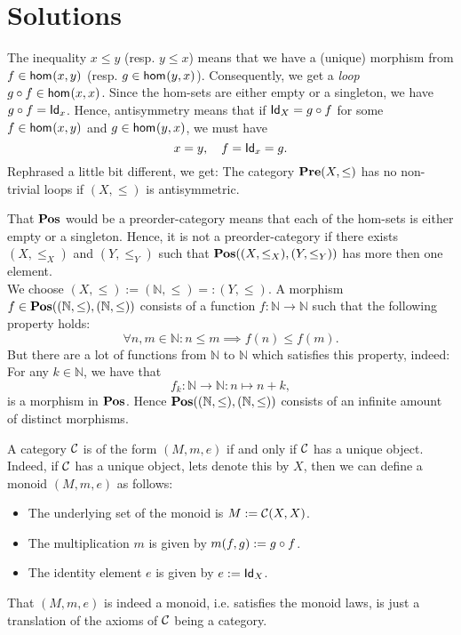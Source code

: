 \section{Solutions}
\label{sec:solutions}

\begin{solution}\label{sol:post_antisymmetry}
The inequality $x\leq y$ (resp. $y\leq x$) means that we have a (unique) morphism from $f\in \Hom{x}{y}$ (resp. $g\in \Hom{y}{x}$). Consequently, we get a \textit{loop} $\co{f}{g} \in \Hom{x}{x}$. Since the hom-sets are either empty or a singleton, we have $\co{f}{g} = \Id[x]$. Hence, antisymmetry means that if $\Id[X] = \co{f}{g}$ for some $f\in \Hom{x}{y}$ and $g\in \Hom{y}{x}$, we must have 
\[x=y,\quad f = \Id[x] = g.\]
Rephrased a little bit different, we get: The category $\PRE(X,\leq)$ has no non-trivial loops if $(X,\leq)$ is antisymmetric.
\end{solution}

\begin{solution}\label{sol:POS_isnt_a_posetcat}
That $\POS$ would be a preorder-category means that each of the hom-sets is either empty or a singleton. Hence, it is not a preorder-category if there exists $(X,\leq_X)$ and $(Y,\leq_Y)$ such that $\CHom{\POS}{(X,\leq_X)}{(Y,\leq_Y)}$ has more then one element.\\
We choose $(X,\leq) := (\mathbb{N},\leq) =: (Y,\leq)$. A morphism $f\in \CHom{\POS}{(\mathbb{N},\leq)}{(\mathbb{N},\leq)}$ consists of a function $f:\mathbb{N}\to\mathbb{N}$ such that the following property holds:
\[
\forall n,m\in\mathbb{N}: n\leq m \implies f(n)\leq f(m).
\]
But there are a lot of functions from $\mathbb{N}$ to $\mathbb{N}$ which satisfies this property, indeed: For any $k\in\mathbb{N}$, we have that
\[
f_k : \mathbb{N}\to\mathbb{N}: n\mapsto n+k,
\]
is a morphism in $\POS$. Hence $\CHom{\POS}{(\mathbb{N},\leq)}{(\mathbb{N},\leq)}$ consists of an infinite amount of distinct morphisms.
\end{solution} 

\begin{solution}\label{sol:categories_coming_from_monoids}
A category $\CC$ is of the form $(M,m,e)$ if and only if $\CC$ has a unique object. Indeed, if $\CC$ has a unique object, lets denote this by $X$, then we can define a monoid $(M,m,e)$ as follows:
\begin{itemize}
\item The underlying set of the monoid is $M := \CHom{\CC}{X}{X}$.
\item The multiplication $m$ is given by $m(f,g) := \co{f}{g}$.
\item The identity element $e$ is given by $e := \Id[X]$.
\end{itemize}
That $(M,m,e)$ is indeed a monoid, i.e. satisfies the monoid laws, is just a translation of the axioms of $\CC$ being a category.
\end{solution}

